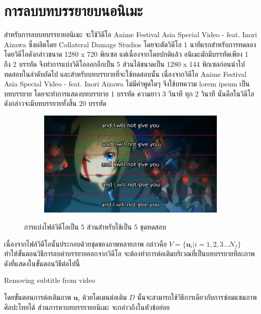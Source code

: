 \section{การลบบทบรรยายบนอนิเมะ}
\hspace{1cm} สำหรับการลบบทบรรยายอนิเมะ จะใช้วิดีโอ Anime Festival Asia Special Video - feat. Inori Aizawa ซึ่งผลิตโดย Collateral Damage Studios โดยจะตัดวิดีโอ 1 นาทีแรกสำหรับการทดลอง โดยวิดีโอดังกล่าวขนาด 1280 x 720 พิกเซล แต่เนื่องจากโดยปกติแล้ว อนิเมะมักมีบรรทัดเพียง 1 ถึง 2 บรรทัด จึงทำการแบ่งวิดีโอออกอีกเป็น 5 ส่วนได้ขนาดเป็น 1280 x 144 พิกเซลก่อนนำไปทดสอบในลำดับถัดไป
\hspace{1cm} และสำหรับบทบรรยายที่จะใช้ทดสอบนั้น เนื่องจากวิดีโอ Anime Festival Asia Special Video - feat. Inori Aizawa ไม่มีคำพูดใดๆ จึงใช้บทความ lorem ipsum เป็นบทบรรยาย โดยจะทำการแสดงบทบรรยาย 1 บรรทัด ความยาว 3 วินาที ทุก 2 วินาที นั่นคือในวิดีโอดังกล่าวจะมีบทบรรยายทั้งสิ้น 20 บรรทัด	
	
	\begin{figure}[H]
		\centering
		\begin{subfigure}{0.8\linewidth}
			\centering
			\includegraphics[width=0.8\linewidth]{image/inori-subbed-preview.png}
		\end{subfigure}
		\caption{การแบ่งไฟล์วิดีโอเป็น 5 ส่วนสำหรับใช้เป็น 5 ชุดทดสอบ}
    \end{figure}
    

	\hspace{1cm}เนื่องจากไฟล์วิดีโอนั้นประกอบด้วยชุดของภาพหลายภาพ กล่าวคือ $V = \{\boldsymbol{u}_i| i = 1,2,3 ... N_f\}$ ทำให้ขั้นตอนวิธีการลบคำบรรยายออกจากวิดีโอ จะต้องทำการต่อเติมบริเวณที่เป็นบทบรรยายทีละภาพ ดังที่แสดงในขั้นตอนวิธีต่อไปนี้ \\
	
	\begin{algorithm}[H]
		\caption{Removing subtitle from video}	
		\SetAlgoNoLine
	\end{algorithm}
	\vspace{1cm}
    \hspace{1cm} โดยขั้นตอนการต่อเติมภาพ $\boldsymbol{u}_i$ ด้วยโดเมนต่อเติม $D$ นั้นจะสามารถใช้วิธีการเดียวกับการซ่อมแซมภาพศิลปะไทยได้ ส่วนการหาบทบรรยายอนิเมะ จะกล่าวถึงในหัวข้อย่อย
